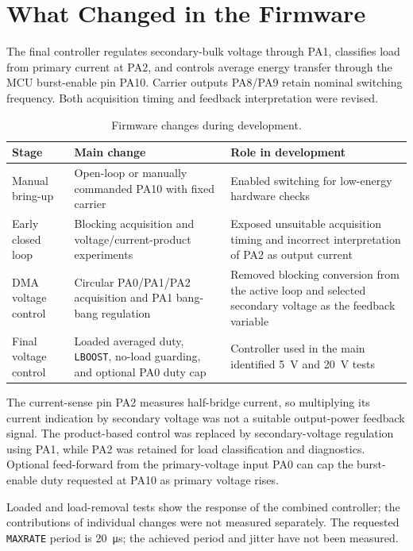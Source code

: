 \section{What Changed in the Firmware}
\label{sec:res-fwcompare}

The final controller regulates secondary-bulk voltage through PA1, classifies
load from primary current at PA2, and controls average energy transfer through
the MCU burst-enable pin PA10. Carrier outputs PA8/PA9 retain nominal switching
frequency. Both acquisition timing and feedback interpretation were revised.

\begin{table}[htbp]
\centering
\caption{Firmware changes during development.}
\label{tab:firmware-comparison}
\small
\begin{tabularx}{\textwidth}{@{}L{0.20\textwidth}L{0.33\textwidth}X@{}}
\toprule
Stage & Main change & Role in development\\
\midrule
Manual bring-up & Open-loop or manually commanded PA10 with fixed carrier & Enabled switching for low-energy hardware checks\\
Early closed loop & Blocking acquisition and voltage/current-product experiments & Exposed unsuitable acquisition timing and incorrect interpretation of PA2 as output current\\
DMA voltage control & Circular PA0/PA1/PA2 acquisition and PA1 bang-bang regulation & Removed blocking conversion from the active loop and selected secondary voltage as the feedback variable\\
Final voltage control & Loaded averaged duty, \texttt{LBOOST}, no-load guarding, and optional PA0 duty cap & Controller used in the main identified \SI{5}{\volt} and \SI{20}{\volt} tests\\
\bottomrule
\end{tabularx}
\end{table}

The current-sense pin PA2 measures half-bridge current, so multiplying its current indication by secondary voltage
was not a suitable output-power feedback signal. The product-based control
was replaced by secondary-voltage regulation using PA1, while PA2 was retained
for load classification and diagnostics. Optional feed-forward from the primary-voltage input PA0 can cap
the burst-enable duty requested at PA10 as primary voltage rises.

Loaded and load-removal tests show the response of the combined controller;
the contributions of individual changes were not measured separately. The
requested \texttt{MAXRATE} period is \SI{20}{\micro\second}; the achieved
period and jitter have not been measured.
